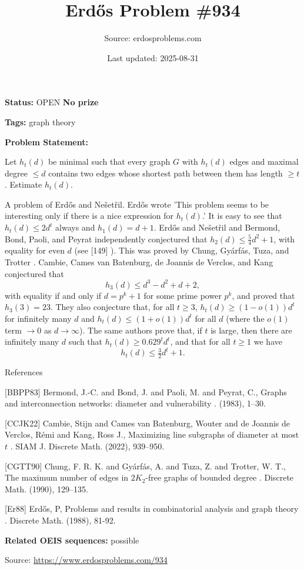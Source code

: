 \documentclass{article}
\title{Erd\H{o}s Problem \#934}
\date{Last updated: 2025-08-31}
\author{Source: erdosproblems.com}
\begin{document}
\maketitle

\noindent\textbf{Status:} OPEN \quad \textbf{No prize}

\noindent\textbf{Tags:} graph theory

\medskip

\noindent\textbf{Problem Statement:}

Let $h_t(d)$ be minimal such that every graph $G$ with $h_t(d)$ edges and maximal degree $\leq d$ contains two edges whose shortest path between them has length $\geq t$. Estimate $h_t(d)$.




A problem of Erd\H{o}s and Ne\v{s}et\v{r}il. Erd\H{o}s \cite{Er88} wrote 'This problem seems to be interesting only if there is a nice expression for $h_t(d)$.' It is easy to see that $h_t(d)\leq 2d^t$ always and $h_1(d)=d+1$. Erd\H{o}s and Ne\v{s}et\v{r}il and Bermond, Bond, Paoli, and Peyrat \cite{BBPP83} independently conjectured that $h_2(d) \leq \tfrac{5}{4}d^2+1$, with equality for even $d$ (see [149] ). This was proved by Chung, Gy\'{a}rf\'{a}s, Tuza, and Trotter \cite{CGTT90}. Cambie, Cames van Batenburg, de Joannis de Verclos, and Kang \cite{CCJK22} conjectured that\[h_3(d) \leq d^3-d^2+d+2,\]with equality if and only if $d=p^k+1$ for some prime power $p^k$, and proved that $h_3(3)=23$. They also conjecture that, for all $t\geq 3$, $h_t(d)\geq (1-o(1))d^t$ for infinitely many $d$ and $h_t(d)\leq (1+o(1))d^t$ for all $d$ (where the $o(1)$ term $\to 0$ as $d\to \infty$). The same authors prove that, if $t$ is large, then there are infinitely many $d$ such that $h_t(d) \geq 0.629^td^t$, and that for all $t\geq 1$ we have\[h_t(d) \leq \tfrac{3}{2}d^t+1.\]




References

[BBPP83] Bermond, J.-C. and Bond, J. and Paoli, M. and Peyrat, C., Graphs and interconnection networks: diameter and vulnerability . (1983), 1--30.

[CCJK22] Cambie, Stijn and Cames van Batenburg, Wouter and de Joannis de Verclos, R\'{e}mi and Kang, Ross J., Maximizing line subgraphs of diameter at most {$t$} . SIAM J. Discrete Math. (2022), 939--950.

[CGTT90] Chung, F. R. K. and Gy\'{a}rf\'{a}s, A. and Tuza, Z. and Trotter, W. T., The maximum number of edges in {$2K_2$}-free graphs of bounded degree . Discrete Math. (1990), 129--135.

[Er88] Erd\H{o}s, P, Problems and results in combinatorial analysis and graph theory . Discrete Math. (1988), 81-92.

\noindent\textbf{Related OEIS sequences:} possible


\bigskip
\noindent\small{Source: \url{https://www.erdosproblems.com/934}}
\end{document}
